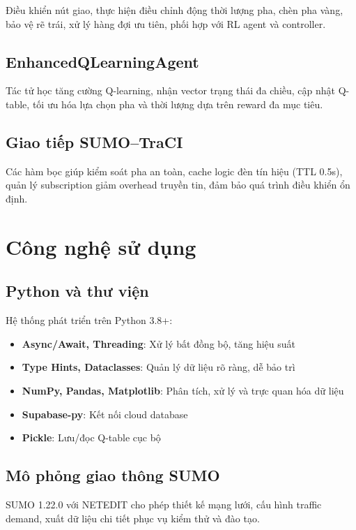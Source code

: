 Điều khiển nút giao, thực hiện điều chỉnh động thời lượng pha, chèn pha vàng, bảo vệ rẽ trái, xử lý hàng đợi ưu tiên, phối hợp với RL agent và controller.

\subsection{EnhancedQLearningAgent}

Tác tử học tăng cường Q-learning, nhận vector trạng thái đa chiều, cập nhật Q-table, tối ưu hóa lựa chọn pha và thời lượng dựa trên reward đa mục tiêu.

\subsection{Giao tiếp SUMO–TraCI}

Các hàm bọc giúp kiểm soát pha an toàn, cache logic đèn tín hiệu (TTL 0.5s), quản lý subscription giảm overhead truyền tin, đảm bảo quá trình điều khiển ổn định.

\section{Công nghệ sử dụng}

\subsection{Python và thư viện}

Hệ thống phát triển trên Python 3.8+:
\begin{itemize}
    \item \textbf{Async/Await, Threading}: Xử lý bất đồng bộ, tăng hiệu suất
    \item \textbf{Type Hints, Dataclasses}: Quản lý dữ liệu rõ ràng, dễ bảo trì
    \item \textbf{NumPy, Pandas, Matplotlib}: Phân tích, xử lý và trực quan hóa dữ liệu
    \item \textbf{Supabase-py}: Kết nối cloud database
    \item \textbf{Pickle}: Lưu/đọc Q-table cục bộ
\end{itemize}

\subsection{Mô phỏng giao thông SUMO}

SUMO 1.22.0 với NETEDIT cho phép thiết kế mạng lưới, cấu hình traffic demand, xuất dữ liệu chi tiết phục vụ kiểm thử và đào tạo.


